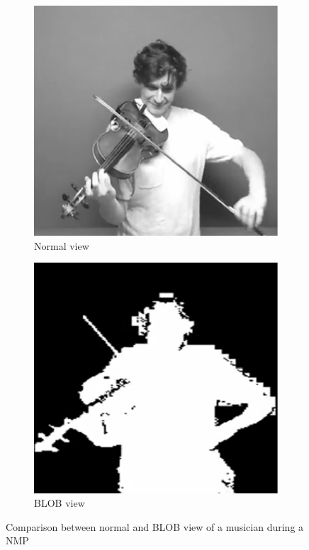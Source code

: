 \begin{figure}[t]
	\centering
	\begin{subfigure}[t]{.46\columnwidth}
		\centering        
		\includegraphics[trim={0cm 0cm 0cm 0cm},clip,width=\textwidth]{img/webcam}
		\caption{Normal view}
		\label{subfig:webcam}
	\end{subfigure}
	\quad
	\begin{subfigure}[t]{.46\columnwidth}
		\centering        
		\includegraphics[trim={0cm 0cm 0cm 0cm},clip,width=\textwidth]{img/blob}
		\caption{BLOB view}
		\label{subfig:blob}
	\end{subfigure}
	\quad 
	\caption{Comparison between normal and BLOB view of a musician during a NMP}\label{fig:wb}
\end{figure}  


